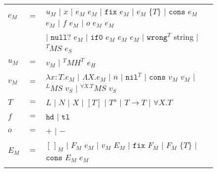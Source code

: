 \begin{figure}[p]
\centering
\begin{tabular}{lcl}
\vspace{5pt}

$e_{M}$ & $=$ & $u_{M}$ $\vert$ $x$ $\vert$ $e_{M}$ $e_{M}$ $\vert$ $\mathtt{fix}$ $e_{M}$ $\vert$ $e_{M}$ $\lbrace T\rbrace$ $\vert$ $\mathtt{cons}$ $e_{M}$ $e_{M}$ $\vert$ $f$ $e_{M}$ $\vert$ $o$ $e_{M}$ $e_{M}$ \\

\vspace{5pt}

&& $\vert$ $\mathtt{null?}$ $e_{M}$ $\vert$ $\mathtt{if0}$ $e_{M}$ $e_{M}$ $e_{M}$ $\vert$ $\mathtt{wrong}^{T}$ string $\vert$ $^{T}MS$ $e_{S}$ \\

\vspace{5pt}

$u_{M}$ & $=$ & $v_{M}$ $\vert$ $^{T}MH^{T}$ $e_{H}$ \\

\vspace{5pt}

$v_{M}$ & $=$ & $\lambda x:T.e_{M}$ $\vert$ $\Lambda X.e_{M}$ $\vert$ $\overline{n}$ $\vert$ $\mathtt{nil}^{T}$ $\vert$ $\mathtt{cons}$ $v_{M}$ $v_{M}$ $\vert$ $^{L}MS$ $v_{S}$ $\vert$ $^{\forall X.T}MS$ $v_{S}$ \\

\vspace{5pt}

$T$ & $=$ & $L$ $\vert$ $N$ $\vert$ $X$ $\vert$ $[T]$ $\vert$ $T^{a}$ $\vert$ $T\rightarrow T$ $\vert$ $\forall X.T$ \\

\vspace{5pt}

$f$ & $=$ & $\mathtt{hd}$ $\vert$ $\mathtt{tl}$ \\

\vspace{5pt}

$o$ & $=$ & $+$ $\vert$ $-$ \\

\vspace{5pt}

$E_{M}$ & $=$ & $[\,]_{M}$ $\vert$ $F_{M}$ $e_{M}$ $\vert$ $v_{M}$ $E_{M}$ $\vert$ $\mathtt{fix}$ $F_{M}$ $\vert$ $F_{M}$ $\lbrace T\rbrace$ $\vert$ $\mathtt{cons}$ $E_{M}$ $e_{M}$ \\

\vspace{5pt}


\end{tabular}
\end{figure}
